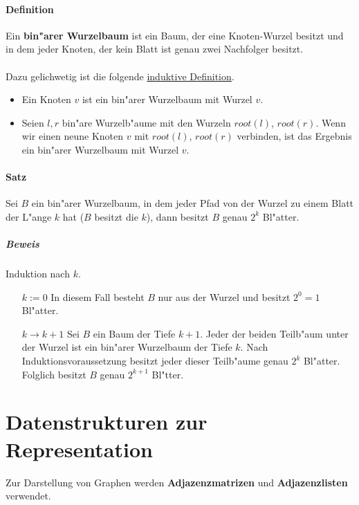 \paragraph{Definition} \parskp
Ein \textbf{bin"arer Wurzelbaum} ist ein Baum, der eine Knoten-Wurzel besitzt und in dem jeder Knoten, der
kein Blatt ist genau zwei Nachfolger besitzt.\\
\\
Dazu gelichwetig ist die folgende \underline{induktive Definition}.
\begin{itemize}
    \item Ein Knoten $v$ ist ein bin"arer Wurzelbaum mit Wurzel $v$.
    \item Seien $l,r$ bin"are Wurzelb"aume mit den Wurzeln $root(l)$, $root(r)$. Wenn wir einen neune
          Knoten $v$ mit $root(l)$, $root(r)$ verbinden, ist das Ergebnis ein bin"arer Wurzelbaum mit
          Wurzel $v$.
\end{itemize}

\paragraph{Satz} \parskp
Sei $B$ ein bin"arer Wurzelbaum, in dem jeder Pfad von der Wurzel zu einem Blatt der L"ange $k$ hat
($B$ besitzt die $k$), dann besitzt $B$ genau $2^k$ Bl"atter. %

\subparagraph{Beweis} Induktion nach $k$.
\begin{itemize}
    \item[$k:=0$] In diesem Fall besteht $B$ nur aus der Wurzel und besitzt $2^0=1$ Bl"atter.
    \item[$k\rightarrow k+1$] Sei $B$ ein Baum der Tiefe $k+1$. Jeder der beiden Teilb"aum unter der Wurzel
                            ist ein bin"arer Wurzelbaum der Tiefe $k$. Nach Induktionsvoraussetzung besitzt
                            jeder dieser Teilb"aume genau $2^k$ Bl"atter. Folglich besitzt $B$ genau
                            $2^{k+1}$ Bl"tter.
\end{itemize}

\section{Datenstrukturen zur Representation}

Zur Darstellung von Graphen werden \textbf{Adjazenzmatrizen} und \textbf{Adjazenzlisten} verwendet.

